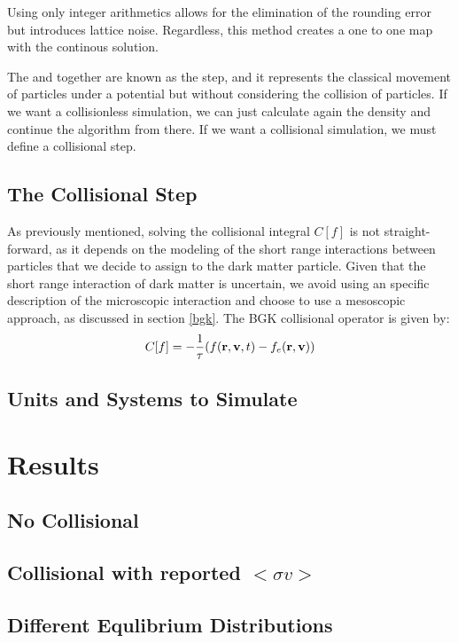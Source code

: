 Using only integer arithmetics allows for the elimination of the rounding error but introduces lattice noise. Regardless, this method creates a one to one map with the continous solution.\cite{franco} \cite{integerLatticeDynamics}

The  and  together are known as the  step, and it represents the classical movement of particles under a potential but without considering the collision of particles. If we want a collisionless simulation, we can just calculate again the density and continue the algorithm from there. If we want a collisional simulation, we must define a collisional step.

\section{The Collisional Step}
As previously mentioned, solving the collisional integral $C[f]$ is not straight-forward, as it depends on the modeling of the short range interactions between particles that we decide to assign to the dark matter particle. Given that the short range interaction of dark matter is uncertain, we avoid using an specific description of the microscopic interaction and choose to use a mesoscopic approach, as discussed in section \ref{bgk}. The BGK collisional operator is given by:\\
\begin{equation}
C[f] = -\frac{1}{\tau}(\f - f_e(\rv))
\end{equation}

\section{Units and Systems to Simulate}

















\chapter{Results}
\section{No Collisional}
\section{Collisional with reported $<\sigma v>$}
\section{Different Equlibrium Distributions}